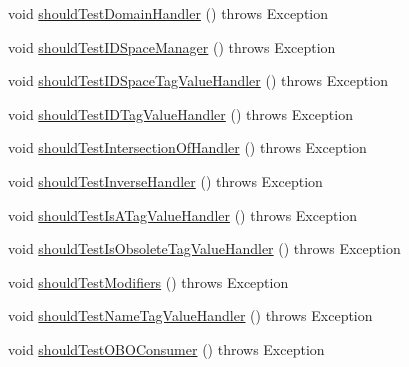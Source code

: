 \begin{DoxyCompactItemize}
\item 
void \hyperlink{classorg_1_1semanticweb_1_1owlapi_1_1contract_1_1_contract_obo_parser_test_ac105da82e071064c7c2b21ff684b042b}{should\-Test\-Domain\-Handler} ()  throws Exception 
\item 
void \hyperlink{classorg_1_1semanticweb_1_1owlapi_1_1contract_1_1_contract_obo_parser_test_a9165441e38b9178c614344cef584e1b1}{should\-Test\-I\-D\-Space\-Manager} ()  throws Exception 
\item 
void \hyperlink{classorg_1_1semanticweb_1_1owlapi_1_1contract_1_1_contract_obo_parser_test_adf9bd3dbc7f2629bd43f1218ae340537}{should\-Test\-I\-D\-Space\-Tag\-Value\-Handler} ()  throws Exception 
\item 
void \hyperlink{classorg_1_1semanticweb_1_1owlapi_1_1contract_1_1_contract_obo_parser_test_a32bed3060013a8a292547e35da9b863c}{should\-Test\-I\-D\-Tag\-Value\-Handler} ()  throws Exception 
\item 
void \hyperlink{classorg_1_1semanticweb_1_1owlapi_1_1contract_1_1_contract_obo_parser_test_a8b98348ccb1a10e4206e37d6900d8f0d}{should\-Test\-Intersection\-Of\-Handler} ()  throws Exception 
\item 
void \hyperlink{classorg_1_1semanticweb_1_1owlapi_1_1contract_1_1_contract_obo_parser_test_ab3147911d569b7ced5a840fdc2831891}{should\-Test\-Inverse\-Handler} ()  throws Exception 
\item 
void \hyperlink{classorg_1_1semanticweb_1_1owlapi_1_1contract_1_1_contract_obo_parser_test_a944ab49e58b1a732fdb89b53ebfad066}{should\-Test\-Is\-A\-Tag\-Value\-Handler} ()  throws Exception 
\item 
void \hyperlink{classorg_1_1semanticweb_1_1owlapi_1_1contract_1_1_contract_obo_parser_test_a7343e88068ff2577103befeb0f823a50}{should\-Test\-Is\-Obsolete\-Tag\-Value\-Handler} ()  throws Exception 
\item 
void \hyperlink{classorg_1_1semanticweb_1_1owlapi_1_1contract_1_1_contract_obo_parser_test_a337d3f79b21e57f2dafe86927954b559}{should\-Test\-Modifiers} ()  throws Exception 
\item 
void \hyperlink{classorg_1_1semanticweb_1_1owlapi_1_1contract_1_1_contract_obo_parser_test_a044c08a0a2162140d804128f51593da0}{should\-Test\-Name\-Tag\-Value\-Handler} ()  throws Exception 
\item 
void \hyperlink{classorg_1_1semanticweb_1_1owlapi_1_1contract_1_1_contract_obo_parser_test_a1cdaaeccc10cee9e68a42d3d751e41ef}{should\-Test\-O\-B\-O\-Consumer} ()  throws Exception 
\item 

\end{DoxyCompactItemize}
